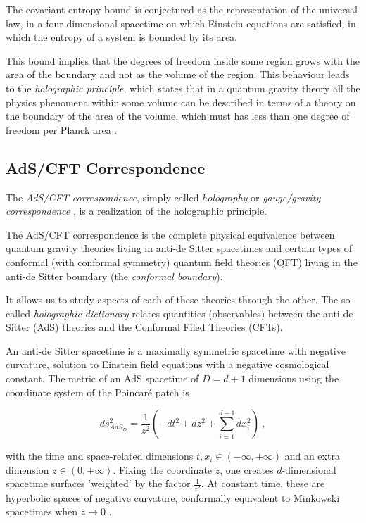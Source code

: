 \documentclass[twocolumn]{revtex4}
\providecommand{\eq}[2]{
    \begin{equation}
        #2
    \label{eq:#1}
    \end{equation}
}
\begin{document}
The covariant entropy bound \cite{bousso_covariant_1999} is conjectured as the representation of the universal law, in a four-dimensional spacetime on which Einstein equations are satisfied, in which the entropy of a system is bounded by its area.

This bound implies that the degrees of freedom inside some region grows with the area of the boundary and not as the volume of the region. This behaviour leads to the \textit{holographic principle}, which states that in a quantum gravity theory all the physics phenomena within some volume can be described in terms of a theory on the boundary of the area of the volume, which must has less than one degree of freedom per Planck area \cite{t_hooft_dimensional_2009}.


\subsection{AdS/CFT Correspondence} \label{ss:AdS/CFT}

The \textit{AdS/CFT correspondence}, simply called \textit{holography} or \textit{gauge/gravity correspondence} \cite{ramallo_introduction_2013}, is a realization of the holographic principle.

The AdS/CFT correspondence is the complete physical equivalence between quantum gravity theories living in anti-de Sitter spacetimes and certain types of conformal (with conformal symmetry) quantum field theories (QFT) living in the anti-de Sitter boundary (the \textit{conformal boundary}).

It allows us to study aspects of each of these theories through the other. The so-called \textit{holographic dictionary} relates quantities (observables) between the anti-de Sitter (AdS) theories and the Conformal Filed Theories (CFTs). %

An anti-de Sitter spacetime is a maximally symmetric spacetime with negative curvature, solution to Einstein field equations with a negative cosmological constant. The metric of an AdS spacetime of $D=d+1$ dimensions using the coordinate system of the Poincaré patch is
\eq{AdS_PP-metric}{
    ds_{AdS_D}^2 = \frac{1}{z^2} \left( -dt^2 + dz^2 + \sum_{i=1}^{d-1} dx_i^2 \right) \ ,
}
\cite{kaplan_lectures_nodate} with the time and space-related dimensions $t , x_i \in (-\infty,+\infty)$ and an extra dimension $z \in (0,+\infty)$. Fixing the coordinate $z$, one creates $d$-dimensional spacetime surfaces 'weighted' by the factor $\frac{1}{z^2}$. At constant time, these are hyperbolic spaces of negative curvature, conformally equivalent to Minkowski spacetimes when $z \to 0$ \cite{}.
\end{document}
